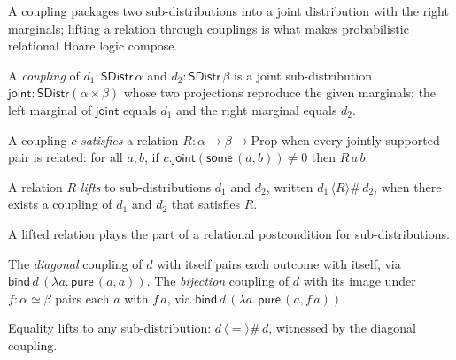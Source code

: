 A coupling packages two sub-distributions into a joint distribution with the
right marginals; lifting a relation through couplings is what makes
probabilistic relational Hoare logic compose.

\begin{definition}[Coupling]
  \label{def:coupling}
  \leanok
  A \emph{coupling} of $d_1 : \mathsf{SDistr}\,\alpha$ and
  $d_2 : \mathsf{SDistr}\,\beta$ is a joint sub-distribution
  $\mathsf{joint} : \mathsf{SDistr}(\alpha \times \beta)$ whose two projections
  reproduce the given marginals: the left marginal of $\mathsf{joint}$ equals
  $d_1$ and the right marginal equals $d_2$.
\end{definition}

\begin{definition}
  \label{def:coupling-satisfies}
  \leanok
  A coupling $c$ \emph{satisfies} a relation $R : \alpha \to \beta \to
  \mathrm{Prop}$ when every jointly-supported pair is related: for all $a, b$,
  if $c.\mathsf{joint}(\mathsf{some}\,(a,b)) \neq 0$ then $R\,a\,b$.
\end{definition}

\begin{definition}
  \label{def:liftr}
  \leanok
  A relation $R$ \emph{lifts} to sub-distributions $d_1$ and $d_2$, written
  $d_1\,\langle R\rangle\#\,d_2$, when there exists a coupling of $d_1$ and
  $d_2$ that satisfies $R$.
\end{definition}

A lifted relation plays the part of a relational postcondition for sub-distributions.

\begin{definition}
  \label{def:coupling-constructions}
  \leanok
  The \emph{diagonal} coupling of $d$ with itself pairs each outcome with
  itself, via $\mathsf{bind}\,d\,(\lambda a.\,\mathsf{pure}\,(a,a))$. The
  \emph{bijection} coupling of $d$ with its image under $f : \alpha \simeq
  \beta$ pairs each $a$ with $f\,a$, via
  $\mathsf{bind}\,d\,(\lambda a.\,\mathsf{pure}\,(a, f\,a))$.
\end{definition}

\begin{lemma}
  \label{lem:liftr-refl}
  \leanok
  Equality lifts to any sub-distribution: $d\,\langle {=}\rangle\#\,d$, witnessed
  by the diagonal coupling.
\end{lemma}

